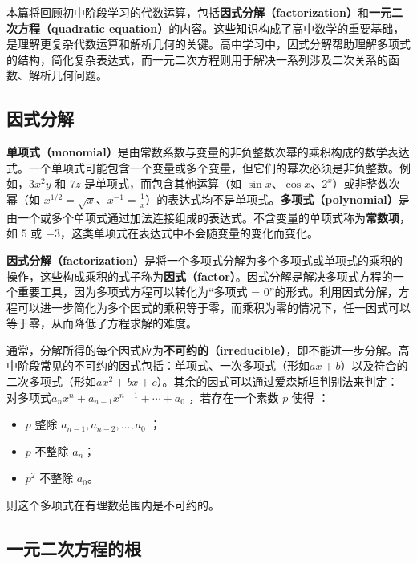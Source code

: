 
本篇将回顾初中阶段学习的代数运算，包括\textbf{因式分解（factorization）}和\textbf{一元二次方程（quadratic equation）}的内容。这些知识构成了高中数学的重要基础，是理解更复杂代数运算和解析几何的关键。高中学习中，因式分解帮助理解多项式的结构，简化复杂表达式，而一元二次方程则用于解决一系列涉及二次关系的函数、解析几何问题。

\subsection{因式分解}

\textbf{单项式（monomial）}是由常数系数与变量的非负整数次幂的乘积构成的数学表达式。一个单项式可能包含一个变量或多个变量，但它们的幂次必须是非负整数。例如，$3x^2y$ 和 $7z$ 是单项式，而包含其他运算（如 $\sin x$、$\cos x$、$2^x$）或非整数次幂（如 $\displaystyle x^{1/2} = \sqrt{x}$、$\displaystyle x^{-1} = \frac{1}{x}$）的表达式均不是单项式。\textbf{多项式（polynomial）}是由一个或多个单项式通过加法连接组成的表达式。不含变量的单项式称为\textbf{常数项}，如 $5$ 或 $-3$，这类单项式在表达式中不会随变量的变化而变化。

\textbf{因式分解（factorization）}是将一个多项式分解为多个多项式或单项式的乘积的操作，这些构成乘积的式子称为\textbf{因式（factor）}。因式分解是解决多项式方程的一个重要工具，因为多项式方程可以转化为“多项式 = 0”的形式。利用因式分解，方程可以进一步简化为多个因式的乘积等于零，而乘积为零的情况下，任一因式可以等于零，从而降低了方程求解的难度。

通常，分解所得的每个因式应为\textbf{不可约的（irreducible）}，即不能进一步分解。高中阶段常见的不可约的因式包括：单项式、一次多项式（形如$ax+b$）以及符合的二次多项式（形如$ax^2+bx+c$）。其余的因式可以通过爱森斯坦判别法来判定：
对多项式$a_n x^n + a_{n-1}x^{n-1} + \cdots + a_0$  ，若存在一个素数  $p$  使得 ：
\begin{itemize}
\item  $p$  整除  $a_{n-1}, a_{n-2}, \dots, a_0$ ；
\item  $p$  不整除  $a_n$；
\item  $p^2$  不整除  $a_0$。
\end{itemize}
则这个多项式在有理数范围内是不可约的。

\subsection{一元二次方程的根}

